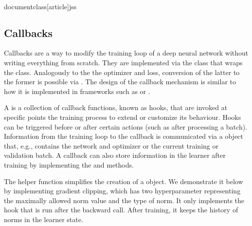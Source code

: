 \\documentclass[article]{jss}
\theoremstyle{definition}
\begin{document}
\begin{CodeInput}
\end{CodeInput}

\subsection{Callbacks}\label{sec:extending-callbacks}

Callbacks are a way to modify the training loop of a deep neural network without writing everything from scratch.
They are implemented via the  class  that wraps the  class.
Analogously to the the optimizer and loss, conversion of the latter to the former is possible via .
The design of the callback mechanism is similar to how it is implemented in frameworks such as \keras{} or \luz{} \citep{ref-chollet2018keras, ref-luz2023}.

A  is a collection of callback functions, known as hooks, that are invoked at specific points the training process to extend or customize its behaviour.
Hooks can be triggered before or after certain actions (such as after processing a batch).
Information from the training loop to the callback is communicated via a  object that, e.g., contains the network and optimizer or the current training or validation batch.
A callback can also store information in the learner after training by implementing the  and  methods.

The  helper function simplifies the creation of a  object.
We demonstrate it below by implementing gradient clipping, which has two hyperparameter representing the maximally allowed norm value and the type of norm.
It only implements the hook that is run after the backward call.
After training, it keeps the history of norms in the learner state.

\end{document}
